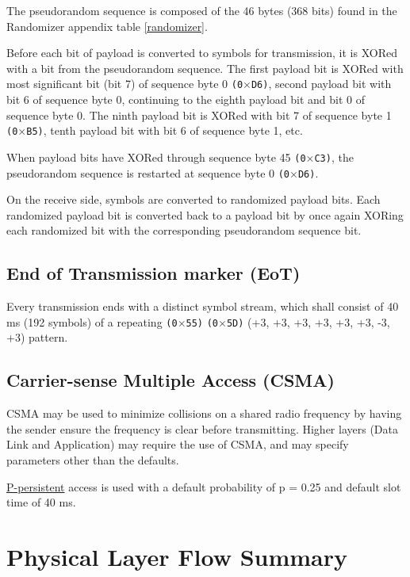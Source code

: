 \documentclass[a4paper,11pt,oneside]{book}
\begin{document}
The pseudorandom sequence is composed of the 46 bytes (368 bits) found in the Randomizer appendix table \ref{randomizer}.

Before each bit of payload is converted to symbols for transmission, it is XORed with a bit from the pseudorandom sequence. The first payload bit is XORed with most significant bit (bit 7) of sequence byte 0 \texttt{(0$\times$D6)}, second payload bit with bit 6 of sequence byte 0, continuing to the eighth payload bit and bit 0 of sequence byte 0. The ninth payload bit is XORed with bit 7 of sequence byte 1 \texttt{(0$\times$B5)}, tenth payload bit with bit 6 of sequence byte 1, etc.

When payload bits have XORed through sequence byte 45 \texttt{(0$\times$C3)}, the pseudorandom sequence is restarted at sequence byte 0 \texttt{(0$\times$D6)}.

On the receive side, symbols are converted to randomized payload bits. Each randomized payload bit is converted back to a payload bit by once
again XORing each randomized bit with the corresponding pseudorandom sequence bit.

\subsection{End of Transmission marker (EoT)}

Every transmission ends with a distinct symbol stream, which shall consist of 40 ms (192 symbols) of a repeating \texttt{(0$\times$55)} \texttt{(0$\times$5D)} (+3, +3, +3, +3, +3, +3, -3, +3) pattern.

\subsection{Carrier-sense Multiple Access (CSMA)}

CSMA may be used to minimize collisions on a shared radio frequency by having the sender ensure the frequency is clear before transmitting. Higher layers (Data Link and Application) may require the use of CSMA, and may specify parameters other than the defaults.

\href{https://en.wikipedia.org/wiki/Carrier-sense_multiple_access}{P-persistent} access is used with a default probability of p = 0.25 and default slot time of 40 ms.

\section{Physical Layer Flow Summary}
\end{document}
